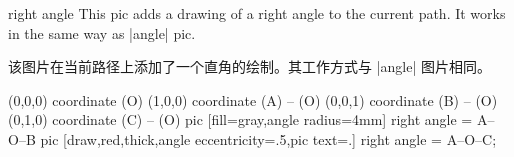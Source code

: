 \begin{pictype}{right angle}{}
    This pic adds a drawing of a right angle to the current path. It works in
    the same way as |angle| pic.
    
    该图片在当前路径上添加了一个直角的绘制。其工作方式与 |angle| 图片相同。


\begin{codeexample}[preamble={\usetikzlibrary{angles}}]
  \tikz
    \draw (0,0,0) coordinate (O)
      (1,0,0) coordinate (A) -- (O)
      (0,0,1) coordinate (B) -- (O)
      (0,1,0) coordinate (C) -- (O)
      pic [fill=gray,angle radius=4mm] {right angle = A--O--B}
      pic [draw,red,thick,angle eccentricity=.5,pic text=.]
        {right angle = A--O--C};
\end{codeexample}
\end{pictype}


